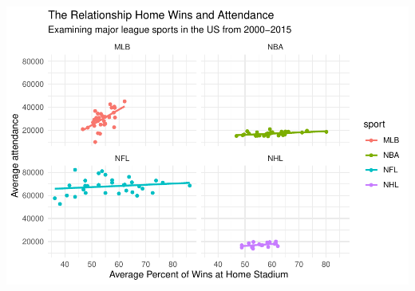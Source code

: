 \documentclass[man, fleqn, noextraspace,floatsintext]{apa6}
\begin{document}
\includegraphics{Final_Project_files/figure-latex/plots-4.pdf}
\end{document}
